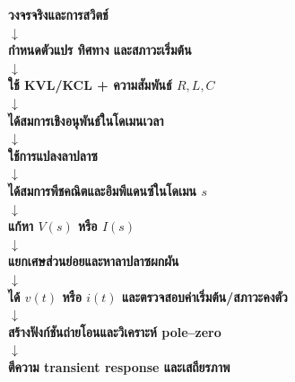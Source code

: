 \textbf{วงจรจริงและการสวิตช์}\\
$\downarrow$\\
\textbf{กำหนดตัวแปร ทิศทาง และสภาวะเริ่มต้น}\\
$\downarrow$\\
\textbf{ใช้ KVL/KCL + ความสัมพันธ์ $R,L,C$}\\
$\downarrow$\\
\textbf{ได้สมการเชิงอนุพันธ์ในโดเมนเวลา}\\
$\downarrow$\\
\textbf{ใช้การแปลงลาปลาซ}\\
$\downarrow$\\
\textbf{ได้สมการพีชคณิตและอิมพีแดนซ์ในโดเมน $s$}\\
$\downarrow$\\
\textbf{แก้หา $V(s)$ หรือ $I(s)$}\\
$\downarrow$\\
\textbf{แยกเศษส่วนย่อยและหาลาปลาซผกผัน}\\
$\downarrow$\\
\textbf{ได้ $v(t)$ หรือ $i(t)$ และตรวจสอบค่าเริ่มต้น/สภาวะคงตัว}\\
$\downarrow$\\
\textbf{สร้างฟังก์ชันถ่ายโอนและวิเคราะห์ pole–zero}\\
$\downarrow$\\
\textbf{ตีความ transient response และเสถียรภาพ}


